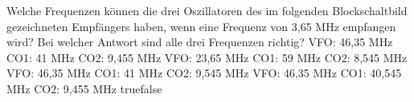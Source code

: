     {Welche Frequenzen können die drei Oszillatoren des im folgenden Blockschaltbild gezeichneten Empfängers haben, wenn eine Frequenz von 3,65 MHz empfangen wird? Bei welcher Antwort sind alle drei Frequenzen richtig?}
    {VFO: 46,35 MHz CO1: 41 MHz CO2: 9,455 MHz}
    {VFO: 23,65 MHz CO1: 59 MHz CO2: 8,545 MHz}
    {VFO: 46,35 MHz CO1: 41 MHz CO2: 9,545 MHz}
    {VFO: 46,35 MHz CO1: 40,545 MHz CO2: 9,455 MHz}
    {true}{false}
